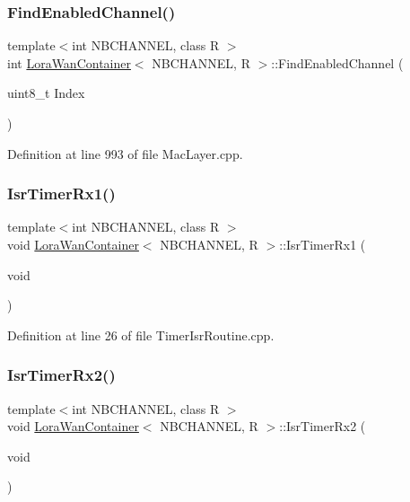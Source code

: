 \subsubsection{\texorpdfstring{Find\+Enabled\+Channel()}{FindEnabledChannel()}}
{\footnotesize\ttfamily template$<$int N\+B\+C\+H\+A\+N\+N\+EL, class R $>$ \\
int \mbox{\hyperlink{class_lora_wan_container}{Lora\+Wan\+Container}}$<$ N\+B\+C\+H\+A\+N\+N\+EL, R $>$\+::Find\+Enabled\+Channel (\begin{DoxyParamCaption}\item[{uint8\+\_\+t}]{Index }\end{DoxyParamCaption})\hspace{0.3cm}{\ttfamily [protected]}}



Definition at line 993 of file Mac\+Layer.\+cpp.

\mbox{\label{class_lora_wan_container_a0c319cd6644631008aaa3e600e66d2a4}} 
\subsubsection{\texorpdfstring{Isr\+Timer\+Rx1()}{IsrTimerRx1()}}
{\footnotesize\ttfamily template$<$int N\+B\+C\+H\+A\+N\+N\+EL, class R $>$ \\
void \mbox{\hyperlink{class_lora_wan_container}{Lora\+Wan\+Container}}$<$ N\+B\+C\+H\+A\+N\+N\+EL, R $>$\+::Isr\+Timer\+Rx1 (\begin{DoxyParamCaption}\item[{void}]{ }\end{DoxyParamCaption})}



Definition at line 26 of file Timer\+Isr\+Routine.\+cpp.

\mbox{\label{class_lora_wan_container_a787bbbf8efd3d85e2938c0bf46b22bfd}} 
\subsubsection{\texorpdfstring{Isr\+Timer\+Rx2()}{IsrTimerRx2()}}
{\footnotesize\ttfamily template$<$int N\+B\+C\+H\+A\+N\+N\+EL, class R $>$ \\
void \mbox{\hyperlink{class_lora_wan_container}{Lora\+Wan\+Container}}$<$ N\+B\+C\+H\+A\+N\+N\+EL, R $>$\+::Isr\+Timer\+Rx2 (\begin{DoxyParamCaption}\item[{void}]{ }\end{DoxyParamCaption})}



